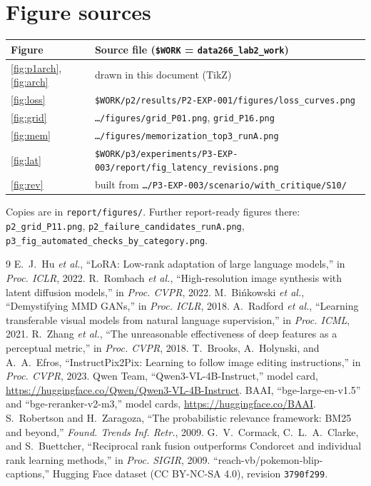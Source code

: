 \documentclass[conference]{IEEEtran}
\begin{document}
\section{Figure sources}
\begin{table}[h]\centering\footnotesize
\begin{tabular}{ll}\toprule
Figure & Source file (\texttt{\$WORK} = \texttt{data266\_lab2\_work})\\\midrule
\ref{fig:p1arch}, \ref{fig:arch} & drawn in this document (TikZ)\\
\ref{fig:loss} & \texttt{\$WORK/p2/results/P2-EXP-001/figures/loss\_curves.png}\\
\ref{fig:grid} & \texttt{\ldots/figures/grid\_P01.png}, \texttt{grid\_P16.png}\\
\ref{fig:mem} & \texttt{\ldots/figures/memorization\_top3\_runA.png}\\
\ref{fig:lat} & \texttt{\$WORK/p3/experiments/P3-EXP-003/report/fig\_latency\_revisions.png}\\
\ref{fig:rev} & built from \texttt{\ldots/P3-EXP-003/scenario/with\_critique/S10/}\\\bottomrule
\end{tabular}\end{table}
Copies are in \texttt{report/figures/}. Further report-ready figures there: \texttt{p2\_grid\_P11.png}, \texttt{p2\_failure\_candidates\_runA.png}, \texttt{p3\_fig\_automated\_checks\_by\_category.png}.

\begin{thebibliography}{9}
 E.~J.~Hu \emph{et al.}, ``LoRA: Low-rank adaptation of large language models,'' in \emph{Proc. ICLR}, 2022.
 R.~Rombach \emph{et al.}, ``High-resolution image synthesis with latent diffusion models,'' in \emph{Proc. CVPR}, 2022.
 M.~Bi\'nkowski \emph{et al.}, ``Demystifying MMD GANs,'' in \emph{Proc. ICLR}, 2018.
 A.~Radford \emph{et al.}, ``Learning transferable visual models from natural language supervision,'' in \emph{Proc. ICML}, 2021.
 R.~Zhang \emph{et al.}, ``The unreasonable effectiveness of deep features as a perceptual metric,'' in \emph{Proc. CVPR}, 2018.
 T.~Brooks, A.~Holynski, and A.~A.~Efros, ``InstructPix2Pix: Learning to follow image editing instructions,'' in \emph{Proc. CVPR}, 2023.
 Qwen Team, ``Qwen3-VL-4B-Instruct,'' model card, \url{https://huggingface.co/Qwen/Qwen3-VL-4B-Instruct}.
 BAAI, ``bge-large-en-v1.5'' and ``bge-reranker-v2-m3,'' model cards, \url{https://huggingface.co/BAAI}.
 S.~Robertson and H.~Zaragoza, ``The probabilistic relevance framework: BM25 and beyond,'' \emph{Found. Trends Inf. Retr.}, 2009.
 G.~V.~Cormack, C.~L.~A.~Clarke, and S.~Buettcher, ``Reciprocal rank fusion outperforms Condorcet and individual rank learning methods,'' in \emph{Proc. SIGIR}, 2009.
 ``reach-vb/pokemon-blip-captions,'' Hugging Face dataset (CC BY-NC-SA 4.0), revision \texttt{3790f299}.
\end{thebibliography}
\end{document}
